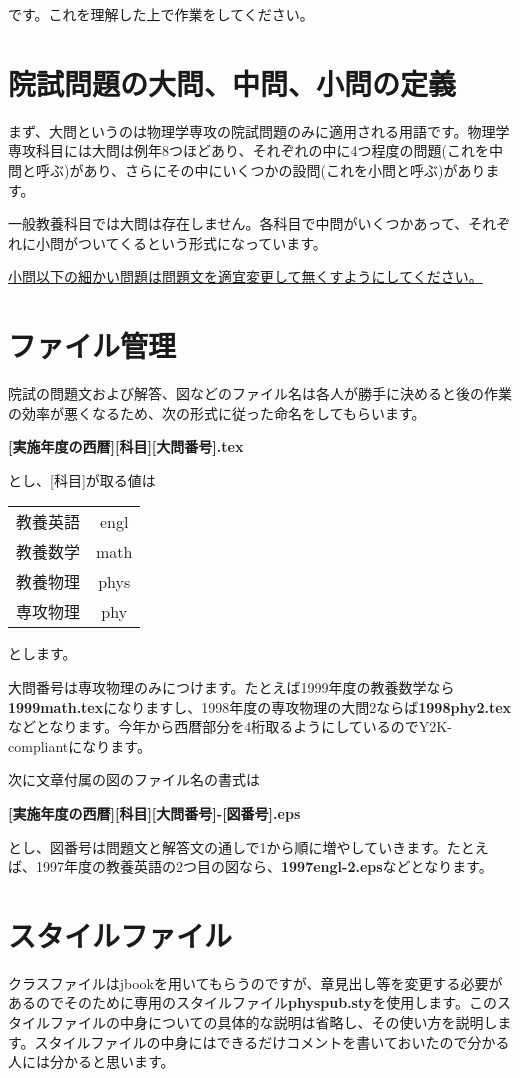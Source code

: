 \documentclass[a4j]{jarticle}
\begin{document}
です。これを理解した上で作業をしてください。

\section{院試問題の大問、中問、小問の定義}
まず、大問というのは物理学専攻の院試問題のみに適用される用語です。物理学専攻科目には大問は例年8つほどあり、それぞれの中に4つ程度の問題(これを中問と呼ぶ)があり、さらにその中にいくつかの設問(これを小問と呼ぶ)があります。

一般教養科目では大問は存在しません。各科目で中問がいくつかあって、それぞれに小問がついてくるという形式になっています。

\underline{小問以下の細かい問題は問題文を適宜変更して無くすようにしてください。}

\section{ファイル管理}
院試の問題文および解答、図などのファイル名は各人が勝手に決めると後の作業の効率が悪くなるため、次の形式に従った命名をしてもらいます。

{\bf [実施年度の西暦][科目][大問番号].tex}

\noindent
とし、[科目]が取る値は

\begin{tabular}{cc}
教養英語 & engl\\
教養数学 & math\\
教養物理 & phys\\
専攻物理 & phy\\
\end{tabular}

とします。

大問番号は専攻物理のみにつけます。たとえば1999年度の教養数学なら{\bf 1999math.tex}になりますし、1998年度の専攻物理の大問2ならば{\bf 1998phy2.tex}などとなります。今年から西暦部分を4桁取るようにしているのでY2K-compliantになります。

次に文章付属の図のファイル名の書式は

{\bf [実施年度の西暦][科目][大問番号]-[図番号].eps}

\noindent
とし、図番号は問題文と解答文の通しで1から順に増やしていきます。たとえば、1997年度の教養英語の2つ目の図なら、{\bf 1997engl-2.eps}などとなります。


\section{スタイルファイル}
クラスファイルはjbookを用いてもらうのですが、章見出し等を変更する必要があるのでそのために専用のスタイルファイル{\bf physpub.sty}を使用します。このスタイルファイルの中身についての具体的な説明は省略し、その使い方を説明します。スタイルファイルの中身にはできるだけコメントを書いておいたので分かる人には分かると思います。
\end{document}
